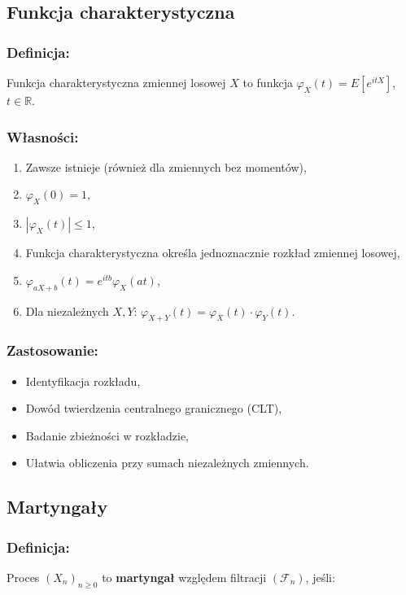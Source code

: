 \subsection{Funkcja charakterystyczna}
\subsubsection*{Definicja:}
Funkcja charakterystyczna zmiennej losowej $X$ to funkcja $\varphi_X(t) = E[e^{itX}]$, $t \in \mathbb{R}$.

\subsubsection*{Własności:}

\begin{enumerate}
    \item Zawsze istnieje (również dla zmiennych bez momentów),
    \item $\varphi_X(0) = 1$,
    \item $|\varphi_X(t)| \leq 1$,
    \item Funkcja charakterystyczna określa jednoznacznie rozkład zmiennej losowej,
    \item $\varphi_{aX + b}(t) = e^{itb} \varphi_X(at)$,
    \item Dla niezależnych $X, Y$: $\varphi_{X+Y}(t) = \varphi_X(t) \cdot \varphi_Y(t)$.
\end{enumerate}

\subsubsection*{Zastosowanie:}

\begin{itemize}
    \item Identyfikacja rozkładu,
    \item Dowód twierdzenia centralnego granicznego (CLT),
    \item Badanie zbieżności w rozkładzie,
    \item Ułatwia obliczenia przy sumach niezależnych zmiennych.
\end{itemize}

\subsection{Martyngały}
\subsubsection*{Definicja:}
Proces $(X_n)_{n \geq 0}$ to \textbf{martyngał} względem filtracji $(\mathcal{F}_n)$, jeśli:

